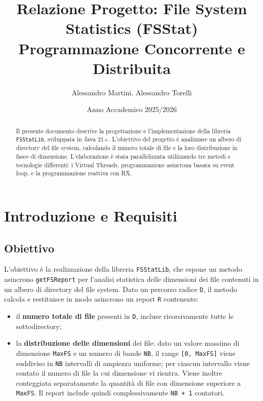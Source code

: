 \documentclass[11pt,a4paper]{article}
\title{\textbf{Relazione Progetto: File System Statistics (FSStat)}\\ \large Programmazione Concorrente e Distribuita}
\author{Alessandro Martini, Alessandro Torelli}
\date{Anno Accademico 2025/2026}
\begin{document}
\maketitle

\begin{abstract}
Il presente documento descrive la progettazione e l'implementazione della libreria \texttt{FSStatLib}, sviluppata in Java 21+. L'obiettivo del 
progetto è analizzare un albero di directory del file system, calcolando il numero totale di file e la loro distribuzione in fasce di dimensione. 
L'elaborazione è stata parallelizzata utilizzando tre metodi e tecnologie differenti: i Virtual Threads, 
programmazione asincrona basata su event loop, e la programmazione reattiva con RX.
\end{abstract}

\tableofcontents
\newpage

\section{Introduzione e Requisiti}

\subsection*{Obiettivo}

L'obiettivo è la realizzazione della libreria \texttt{FSStatLib}, che espone un metodo asincrono \texttt{getFSReport} per l'analisi statistica delle dimensioni dei file contenuti in un albero di directory del file system. Dato un percorso radice \texttt{D}, il metodo calcola e restituisce in modo asincrono un report \texttt{R} contenente:

\begin{itemize}
    \item il \textbf{numero totale di file} presenti in \texttt{D}, incluse ricorsivamente tutte le sottodirectory;
    \item la \textbf{distribuzione delle dimensioni} dei file: dato un valore massimo di dimensione \texttt{MaxFS} e un numero di bande \texttt{NB}, il range \texttt{[0, MaxFS]} viene suddiviso in \texttt{NB} intervalli di ampiezza uniforme; per ciascun intervallo viene contato il numero di file la cui dimensione vi rientra. Viene inoltre conteggiata separatamente la quantità di file con dimensione superiore a \texttt{MaxFS}. Il report include quindi complessivamente \texttt{NB + 1} contatori.
\end{itemize}
\end{document}
